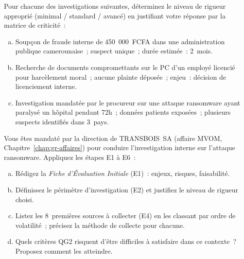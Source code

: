 \begin{boxexo}[title={\ding{45}\quad Exercice~6.1. Matrice de criticité \niveaubase}]
Pour chacune des investigations suivantes, déterminez le niveau de rigueur
approprié (minimal / standard / avancé) en justifiant votre réponse par
la matrice de criticité~:
\begin{enumerate}[(a)]
    \item Soupçon de fraude interne de 450~000~FCFA dans une administration
          publique camerounaise~; suspect unique~; durée estimée~: 2~mois.
    \item Recherche de documents compromettants sur le PC d'un employé
          licencié pour harcèlement moral~; aucune plainte déposée~;
          enjeu~: décision de licenciement interne.
    \item Investigation mandatée par le procureur sur une attaque ransomware
          ayant paralysé un hôpital pendant 72h~; données patients exposées~;
          plusieurs suspects identifiés dans 3~pays.
\end{enumerate}
\end{boxexo}

\begin{boxexo}[title={\ding{45}\quad Exercice~6.2. Application du PIU \niveaumoyen}]
Vous êtes mandaté par la direction de TRANSBOIS~SA (affaire MVOM,
Chapitre~\ref{chap:gr-affaires}) pour conduire l'investigation interne
sur l'attaque ransomware. Appliquez les étapes E1 à E6~:
\begin{enumerate}[(a)]
    \item Rédigez la \textit{Fiche d'Évaluation Initiale} (E1)~: enjeux,
          risques, faisabilité.
    \item Définissez le périmètre d'investigation (E2) et justifiez le niveau
          de rigueur choisi.
    \item Listez les 8~premières sources à collecter (E4) en les classant
          par ordre de volatilité~; précisez la méthode de collecte pour
          chacune.
    \item Quels critères QG2 risquent d'être difficiles à satisfaire dans
          ce contexte~? Proposez comment les atteindre.
\end{enumerate}
\end{boxexo}


